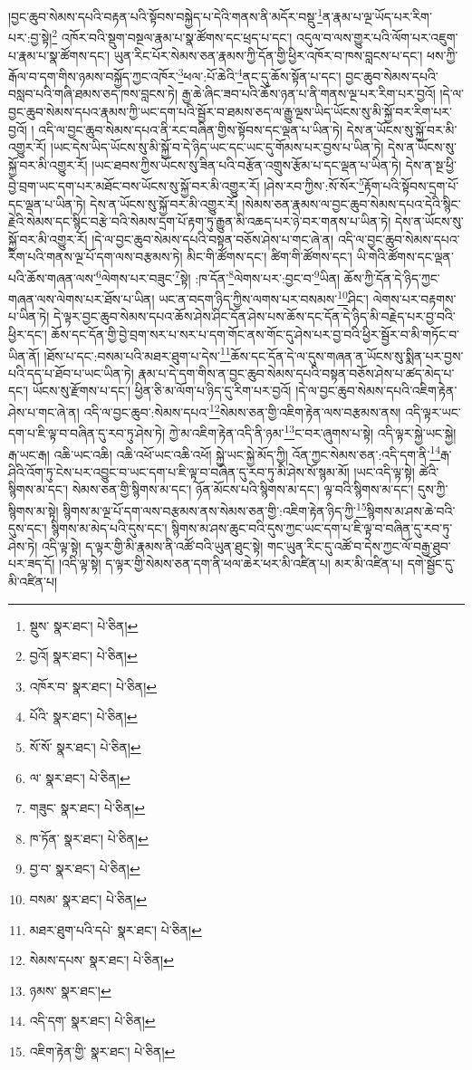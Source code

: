 །བྱང་ཆུབ་སེམས་དཔའི་བརྟན་པའི་སྟོབས་བསྐྱེད་པ་དེའི་གནས་ནི་མདོར་བསྡུ་\footnote{སྡུས་  སྣར་ཐང་།  པེ་ཅིན། }ན་རྣམ་པ་ལྔ་ཡོད་པར་རིག་པར་:བྱ་སྟེ།\footnote{བྱའོ།  སྣར་ཐང་།  པེ་ཅིན། } འཁོར་བའི་སྡུག་བསྔལ་རྣམ་པ་སྣ་ཚོགས་དང་ཕྲད་པ་དང་། འདུལ་བ་ལས་གྱུར་པའི་ལོག་པར་འཇུག་པ་རྣམ་པ་སྣ་ཚོགས་དང་། ཡུན་རིང་པོར་སེམས་ཅན་རྣམས་ཀྱི་དོན་གྱི་ཕྱིར་འཁོར་བ་ཁས་བླངས་པ་དང་། ཕས་ཀྱི་རྒོལ་བ་དག་གིས་ཉམས་བསྐྱོད་ཀྱང་འཁོར་\footnote{འཁོར་བ་  སྣར་ཐང་།  པེ་ཅིན། }ཕལ་:པོ་ཆེའི་\footnote{པོའི་  སྣར་ཐང་།  པེ་ཅིན། }ནང་དུ་ཆོས་སྟོན་པ་དང་། བྱང་ཆུབ་སེམས་དཔའི་བསླབ་པའི་གཞི་ཐམས་ཅད་ཁས་བླངས་ཏེ། རྒྱ་ཆེ་ཞིང་ཟབ་པའི་ཆོས་ཉན་པ་ནི་གནས་ལྔ་པར་རིག་པར་བྱའོ། །དེ་ལ་བྱང་ཆུབ་སེམས་དཔའ་རྣམས་ཀྱི་ཡང་དག་པའི་སྦྱོར་བ་ཐམས་ཅད་ལ་རྒྱུ་ལྔས་ཡིད་ཡོངས་སུ་མི་སྐྱོ་བར་རིག་པར་བྱའོ། །
འདི་ལ་བྱང་ཆུབ་སེམས་དཔའ་ནི་རང་བཞིན་གྱིས་སྟོབས་དང་ལྡན་པ་ཡིན་ཏེ། དེས་ན་ཡོངས་སུ་སྐྱོ་བར་མི་འགྱུར་རོ། །ཡང་དེས་ཡིད་ཡོངས་སུ་མི་སྐྱོ་བ་དེ་ཉིད་ཡང་དང་ཡང་དུ་གོམས་པར་བྱས་པ་ཡིན་ཏེ། དེས་ན་ཡོངས་སུ་སྐྱོ་བར་མི་འགྱུར་རོ། །ཡང་ཐབས་ཀྱིས་ཡོངས་སུ་ཟིན་པའི་བརྩོན་འགྲུས་རྩོམ་པ་དང་ལྡན་པ་ཡིན་ཏེ། དེས་ན་སྔ་ཕྱི་བྱེ་བྲག་ཡང་དག་པར་མཐོང་བས་ཡོངས་སུ་སྐྱོ་བར་མི་འགྱུར་རོ། །ཤེས་རབ་ཀྱིས་:སོ་སོར་\footnote{སོ་སོ་  སྣར་ཐང་།  པེ་ཅིན། }རྟོག་པའི་སྟོབས་དྲག་པོ་དང་ལྡན་པ་ཡིན་ཏེ། དེས་ན་ཡོངས་སུ་སྐྱོ་བར་མི་འགྱུར་རོ། །སེམས་ཅན་རྣམས་ལ་བྱང་ཆུབ་སེམས་དཔའ་དེའི་སྙིང་རྗེའི་སེམས་དང་སྙིང་བརྩེ་བའི་སེམས་དྲག་པོ་རྟག་ཏུ་རྒྱུན་མི་འཆད་པར་ཉེ་བར་གནས་པ་ཡིན་ཏེ། དེས་ན་ཡོངས་སུ་སྐྱོ་བར་མི་འགྱུར་རོ། །དེ་ལ་བྱང་ཆུབ་སེམས་དཔའི་བསྟན་བཅོས་ཤེས་པ་གང་ཞེ་ན། འདི་ལ་བྱང་ཆུབ་སེམས་དཔའ་རིག་པའི་གནས་ལྔ་པོ་དག་ལས་བརྩམས་ཏེ། མིང་གི་ཚོགས་དང་། ཚིག་གི་ཚོགས་དང་། ཡི་གེའི་ཚོགས་དང་ལྡན་པའི་ཆོས་གཞན་ལས་\footnote{ལ་  སྣར་ཐང་།  པེ་ཅིན། }ལེགས་པར་བཟུང་\footnote{གཟུང་  སྣར་ཐང་།  པེ་ཅིན། }སྟེ། :ཁ་དོན་\footnote{ཁ་ཏོན་  སྣར་ཐང་།  པེ་ཅིན། }ལེགས་པར་:བྱང་བ་\footnote{བྱ་བ་  སྣར་ཐང་།  པེ་ཅིན། }ཡིན། ཆོས་ཀྱི་དོན་དེ་ཉིད་ཀྱང་གཞན་ལས་ལེགས་པར་ཐོས་པ་ཡིན། ཡང་ན་བདག་ཉིད་ཀྱིས་ལགས་པར་བསམས་\footnote{བསམ་  སྣར་ཐང་།  པེ་ཅིན། }ཤིང་། ལེགས་པར་བརྟགས་པ་ཡིན་ཏེ། དེ་ལྟར་བྱང་ཆུབ་སེམས་དཔའ་ཆོས་ཤེས་ཤིང་དོན་ཤེས་པས་ཆོས་དང་དོན་དེ་ཉིད་མི་བརྗེད་པར་བྱ་བའི་ཕྱིར་དང་། ཆོས་དང་དོན་གྱི་བྱེ་བྲག་སར་པ་སར་པ་དག་གོང་ནས་གོང་དུ་ཤེས་པར་བྱ་བའི་ཕྱིར་སྦྱོར་བ་མི་གཏོང་བ་ཡིན་ནོ། །ཐོས་པ་དང་:བསམ་པའི་མཐར་ཐུག་པ་དེས་\footnote{མཐར་ཐུག་པའི་དཔེ་  སྣར་ཐང་།  པེ་ཅིན། }ཆོས་དང་དོན་དེ་ལ་དུས་གཞན་ན་ཡོངས་སུ་སྨིན་པར་བྱས་པའི་དད་པ་ཐོབ་པ་ཡང་ཡིན་ཏེ། རྣམ་པ་དེ་དག་གིས་ན་བྱང་ཆུབ་སེམས་དཔའི་བསྟན་བཅོས་ཤེས་པ་ཚད་མེད་པ་དང་། ཡོངས་སུ་རྫོགས་པ་དང་། ཕྱིན་ཅི་མ་ལོག་པ་ཉིད་དུ་རིག་པར་བྱའོ། །དེ་ལ་བྱང་ཆུབ་སེམས་དཔའི་འཇིག་རྟེན་ཤེས་པ་གང་ཞེ་ན། འདི་ལ་བྱང་ཆུབ་:སེམས་དཔའ་\footnote{སེམས་དཔས་  སྣར་ཐང་།  པེ་ཅིན། }སེམས་ཅན་གྱི་འཇིག་རྟེན་ལས་བརྩམས་ནས། འདི་ལྟར་ཡང་དག་པ་ཇི་ལྟ་བ་བཞིན་དུ་རབ་ཏུ་ཤེས་ཏེ། ཀྱེ་མ་འཇིག་རྟེན་འདི་ནི་ཉམ་\footnote{ཉམས་  སྣར་ཐང་། }ང་བར་ཞུགས་པ་སྟེ། འདི་ལྟར་སྐྱེ་ཡང་སྐྱེ། རྒ་ཡང་རྒ། འཆི་ཡང་འཆི། འཆི་འཕོ་ཡང་འཆི་འཕོ། སྐྱེ་ཡང་སྐྱེ་མོད་ཀྱི། འོན་ཀྱང་སེམས་ཅན་:འདི་དག་ནི་\footnote{འདི་དག་  སྣར་ཐང་།  པེ་ཅིན། }རྒ་ཤིའི་འོག་ཏུ་ངེས་པར་འབྱུང་བ་ཡང་དག་པ་ཇི་ལྟ་བ་བཞིན་དུ་རབ་ཏུ་མི་ཤེས་སོ་སྙམ་མོ། །ཡང་འདི་ལྟ་སྟེ། ཚེའི་སྙིགས་མ་དང་། སེམས་ཅན་གྱི་སྙིགས་མ་དང་། ཉོན་མོངས་པའི་སྙིགས་མ་དང་། ལྟ་བའི་སྙིགས་མ་དང་། དུས་ཀྱི་སྙིགས་མ་སྟེ། སྙིགས་མ་ལྔ་པོ་དག་ལས་བརྩམས་ནས་སེམས་ཅན་གྱི་:འཇིག་རྟེན་ཉིད་ཀྱི་\footnote{འཇིག་རྟེན་གྱི་  སྣར་ཐང་།  པེ་ཅིན། }སྙིགས་མ་ཤས་ཆེ་བའི་དུས་དང་། སྙིགས་མ་མེད་པའི་དུས་དང་། སྙིགས་མ་ཤས་ཆུང་བའི་དུས་ཀྱང་ཡང་དག་པ་ཇི་ལྟ་བ་བཞིན་དུ་རབ་ཏུ་ཤེས་ཏེ། འདི་ལྟ་སྟེ། ད་ལྟར་གྱི་མི་རྣམས་ནི་འཚོ་བའི་ཡུན་ཐུང་སྟེ། གང་ཡུན་རིང་དུ་འཚོ་བ་དེས་ཀྱང་ལོ་བརྒྱ་ཐུབ་པར་ཟད་དོ། །འདི་ལྟ་སྟེ། ད་ལྟར་གྱི་སེམས་ཅན་དག་ནི་ཕལ་ཆེར་ཕར་མི་འཛིན་པ། མར་མི་འཛིན་པ། དགེ་སྦྱོང་དུ་མི་འཛིན་པ། 